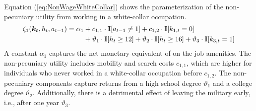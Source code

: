 \noindent Equation (\ref{eq:NonWageWhiteCollar}) shows the parameterization of the non-pecuniary utility from working in a white-collar occupation.
%
\begin{align}\label{eq:NonWageWhiteCollar}
\zeta_{1}(\bm{k_t}, h_t, a_{t-1})  = \alpha_1  &+ c_{1,1} \cdot {\textbf{I}}[a_{t-1} \neq 1] + c_{1,2} \cdot {\textbf{I}}[k_{1,t} = 0] \\ \nonumber
                            & + \vartheta_1 \cdot {\textbf{I}}[h_t \geq 12] + \vartheta_2 \cdot {\textbf{I}}[h_t \geq 16] + \vartheta_3 \cdot {\textbf{I}}[k_{3,t} = 1]
\end{align}
%
A constant $\alpha_1$ captures the net monetary-equivalent of on the job amenities. The non-pecuniary utility includes mobility and search costs $c_{1,1}$, which are higher for individuals who never worked in a white-collar occupation before $c_{1,2}$. The non-pecuniary components capture returns from a high school degree $\vartheta_1$ and a college degree $\vartheta_2$. Additionally, there is a detrimental effect of leaving the military early, i.e., after one year $\vartheta_3$.\\

